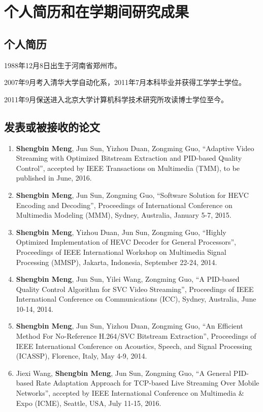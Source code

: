 \chapter{个人简历和在学期间研究成果}

\section*{个人简历}

1988年12月8日出生于河南省郑州市。

2007年9月考入清华大学自动化系，2011年7月本科毕业并获得工学学士学位。

2011年9月保送进入北京大学计算机科学技术研究所攻读博士学位至今。

\renewcommand{\labelenumi}{[\arabic{enumi}]}

\section*{发表或被接收的论文}
\begin{enumerate}
	\item \textbf{Shengbin Meng}, Jun Sun, Yizhou Duan, Zongming Guo, ``Adaptive Video Streaming with Optimized Bitstream Extraction and PID-based Quality Control'', accepted by IEEE Transactions on Multimedia (TMM), to be published in June, 2016.
	\item \textbf{Shengbin Meng}, Jun Sun, Zongming Guo, ``Software Solution for HEVC Encoding and Decoding'', Proceedings of International Conference on Multimedia Modeling (MMM), Sydney, Australia, January 5-7, 2015.
	\item \textbf{Shengbin Meng}, Yizhou Duan, Jun Sun, Zongming Guo, ``Highly Optimized Implementation of HEVC Decoder for General Processors'', Proceedings of IEEE International Workshop on Multimedia Signal Processing (MMSP), Jakarta, Indonesia, September 22-24, 2014.
	\item \textbf{Shengbin Meng}, Jun Sun, Yilei Wang, Zongming Guo, ``A PID-based Quality Control Algorithm for SVC Video Streaming'', Proceedings of IEEE International Conference on Communications (ICC), Sydney, Australia, June 10-14, 2014.
	\item \textbf{Shengbin Meng}, Jun Sun, Yizhou Duan, Zongming Guo, ``An Efficient Method For No-Reference H.264/SVC Bitstream Extraction'', Proceedings of IEEE International Conference on Acoustics, Speech, and Signal Processing (ICASSP), Florence, Italy, May 4-9, 2014.
	\item Jiexi Wang, \textbf{Shengbin Meng}, Jun Sun, Zongming Guo, ``A General PID-based Rate Adaptation Approach for TCP-based Live Streaming Over Mobile Networks'', accepted by IEEE International Conference on Multimedia \& Expo (ICME), Seattle, USA, July 11-15, 2016.
\end{enumerate}

